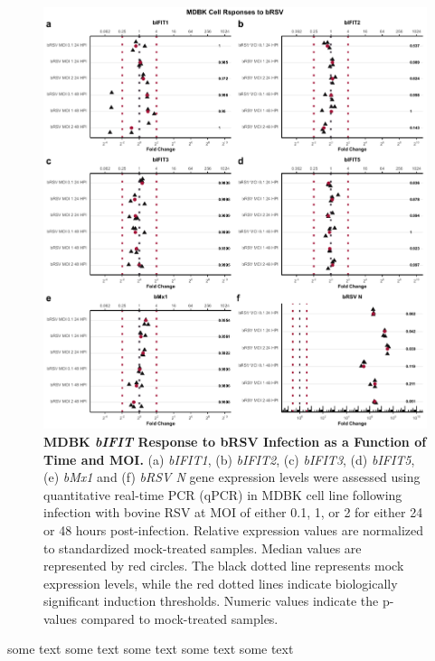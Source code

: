 \begin{figure}
    \centering
    \includegraphics[width=1\linewidth]{07. Chapter 2/Figs/02. Induction/03. mdbk_brsv_timepoints.pdf}
    \caption[MDBK \textit{bIFIT} Response to bRSV Infection as a Function of Time and MOI.]{\textbf{MDBK \textit{bIFIT} Response to bRSV Infection as a Function of Time and MOI.} (a) \textit{bIFIT1}, (b) \textit{bIFIT2}, (c) \textit{bIFIT3}, (d) \textit{bIFIT5}, (e) \textit{bMx1} and (f) \textit{bRSV N} gene expression levels were assessed using quantitative real-time PCR (qPCR) in MDBK cell line following infection with bovine RSV at MOI of either 0.1, 1, or 2 for either 24 or 48 hours post-infection. Relative expression values are normalized to standardized mock-treated samples. Median values are represented by red circles. The black dotted line represents mock expression levels, while the red dotted lines indicate biologically significant induction thresholds. Numeric values indicate the p-values compared to mock-treated samples.}
    \label{fig:MDBK responses to bRSV timepoints}
\end{figure}

some text some text some text some text some text

